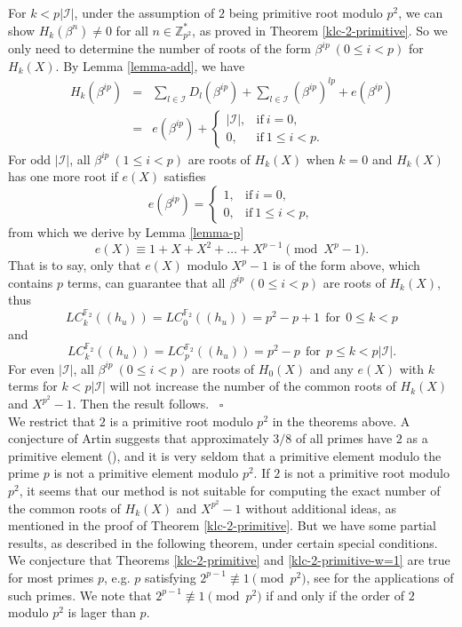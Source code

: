 \documentclass [11pt,a4paper]{article}
\def\F{\mathbb{F}}
\def\Z{\mathbb{Z}}
\begin{document}
For $k< p|\mathcal{I}|$, under the assumption of $2$ being primitive root modulo $p^2$, we can show $H_k(\beta^{n})\neq 0$ for all $n\in \Z_{p^2}^*$, as proved in  Theorem \ref{klc-2-primitive}. So we only need to determine the number of roots of the form $\beta^{ip}  ~ (0\le i<p)$ for $H_k(X)$.
By Lemma \ref{lemma-add}, we have
\begin{eqnarray*}
H_k(\beta^{ip})& = & \sum\limits_{l\in \mathcal{I}}D_{l}(\beta^{ip})+\sum\limits_{l\in \mathcal{I}}(\beta^{ip})^{lp}+e(\beta^{ip})\\
& =&e(\beta^{ip})+ \left\{
\begin{array}{ll}
|\mathcal{I}|, & \mathrm{if}~ i= 0,\\
0, & \mathrm{if}~ 1\le i<p.
\end{array}
\right.
\end{eqnarray*}
For odd $|\mathcal{I}|$, all $\beta^{ip}  ~ (1\le i<p)$ are roots of $H_k(X)$ when $k=0$ and
$H_k(X)$ has one more root if $e(X)$ satisfies
$$
e(\beta^{ip})=\left\{
\begin{array}{ll}
1, & \mathrm{if}~ i= 0,\\
0, & \mathrm{if}~ 1\le i<p,
\end{array}
\right.
$$
from which we derive by Lemma \ref{lemma-p}
$$
e(X)\equiv 1+X+X^2+\ldots+X^{p-1} \pmod {X^p-1}.
$$
That is to say, only that $e(X)$ modulo $X^p-1$ is of the form above, which contains $p$ terms, can guarantee that all $\beta^{ip} ~(0\le i<p)$ are roots of $H_k(X)$,
thus
$$
LC^{\F_2}_k((h_u))=LC^{\F_2}_0((h_u))=p^2-p+1 ~~\mathrm{for}~~ 0\le k< p
$$
and
$$
LC^{\F_2}_k((h_u))=LC^{\F_2}_p((h_u))=p^2-p ~~\mathrm{for}~~ p\le k< p|\mathcal{I}|.
$$
For even $|\mathcal{I}|$, all $\beta^{ip}  ~ (0\le i<p)$ are roots of $H_0(X)$  and any $e(X)$ with $k$ terms for  $k< p|\mathcal{I}|$ will not increase
the number of the common roots of $H_k(X)$ and $X^{p^2}-1$. Then the result follows. ~\hfill $\square$\\


We restrict that $2$ is a primitive root modulo $p^2$ in the theorems above. A
conjecture of Artin suggests that approximately $3/8$ of all primes
have $2$ as a primitive element (\cite[p.81]{Shanks}), and it is
very seldom that a primitive element modulo the prime $p$ is not
 a primitive element modulo $p^2$.
If $2$ is not a primitive root modulo $p^2$, it seems that our method is not suitable for computing the exact number of the common roots of  $H_k(X)$ and $X^{p^2}-1$ without additional ideas, as mentioned in the proof of Theorem \ref{klc-2-primitive}. But we have some partial results, as described in the following theorem, under certain special conditions. We conjecture that Theorems \ref{klc-2-primitive} and \ref{klc-2-primitive-w=1} are true for most primes $p$, e.g. $p$ satisfying $2^{p-1}
\not\equiv 1 \pmod {p^2}$, see \cite{CDP1997,CD} for the applications of such primes. We note that $2^{p-1}
\not\equiv 1 \pmod {p^2}$ if and only if the order of $2$ modulo $p^2$ is lager than $p$.
\end{document}
